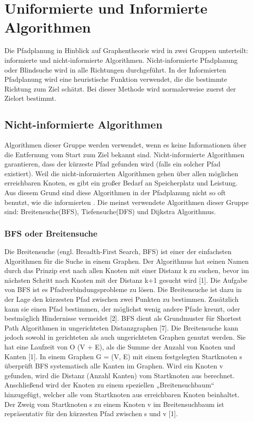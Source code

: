 \chapter{Uniformierte und Informierte Algorithmen}

Die Pfadplanung in Hinblick auf Graphentheorie wird in zwei Gruppen unterteilt: informierte und nicht-informierte Algorithmen. Nicht-informierte Pfadplanung oder Blindsuche wird in alle Richtungen durchgeführt. In der Informierten Pfadplanung wird eine heuristische Funktion verwendet, die die bestimmte Richtung zum Ziel schätzt. Bei dieser Methode wird normalerweise zuerst der Zielort bestimmt\cite{comAnal}.

\section{Nicht-informierte Algorithmen}
Algorithmen dieser Gruppe werden verwendet, wenn es keine Informationen über die Entfernung vom Start zum Ziel bekannt sind. Nicht-informierte Algorithmen garantieren, dass der kürzeste Pfad gefunden wird (falls ein solcher Pfad existiert)\cite{comAnal}. Weil die nicht-informierten Algorithmen gehen über allen möglichen erreichbaren Knoten, es gibt ein großer Bedarf an Speicherplatz und Leistung. Aus diesem Grund sind diese Algorithmen in der Pfadplanung nicht so oft benutzt, wie die informierten\cite{sim} \cite{comAnal}. Die meinst verwendete Algorithmen dieser Gruppe sind: Breitensuche(BFS), Tiefensuche(DFS) und Dijkstra Algorithmus.

\subsection{BFS oder Breitensuche}

Die Breitensuche (engl. Breadth-First Search, BFS) ist einer der einfachsten Algorithmen für die Suche in einem Graphen. Der Algorithmus hat seinen Namen durch das Prinzip erst nach allen Knoten mit einer Distanz k zu suchen, bevor im nächsten Schritt nach Knoten mit der Distanz k+1 gesucht wird [1]. Die Aufgabe von BFS ist es Pfadverbindungsprobleme zu lösen. Die Breitensuche ist dazu in der Lage den kürzesten Pfad zwischen zwei Punkten zu bestimmen. Zusätzlich kann sie einen Pfad bestimmen, der möglichst wenig andere Pfade kreuzt, oder bestmöglich Hindernisse vermeidet [2]. BFS dient als Grundmuster für Shortest Path Algorithmen in ungerichteten Distanzgraphen [7]. Die Breitensuche kann jedoch sowohl in gerichteten als auch ungerichteten Graphen genutzt werden. Sie hat eine Laufzeit von O (V + E), als die Summe der Anzahl von Knoten und Kanten [1].
In einem Graphen G = (V, E) mit einem festgelegten Startknoten s überprüft BFS systematisch alle Kanten im Graphen. Wird ein Knoten v gefunden, wird die Distanz (Anzahl Kanten) vom Startknoten aus berechnet. Anschließend wird der Knoten zu einem speziellen „Breitensuchbaum“ hinzugefügt, welcher alle vom Startknoten aus erreichbaren Knoten beinhaltet. Der Zweig vom Startknoten s zu einem Knoten v im Breitensuchbaum ist repräsentativ für den kürzesten Pfad zwischen s und v [1].


